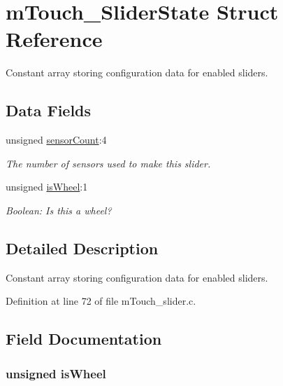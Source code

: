 \hypertarget{structm_touch___slider_state}{}\section{m\+Touch\+\_\+\+Slider\+State Struct Reference}
\label{structm_touch___slider_state}


Constant array storing configuration data for enabled sliders.  


\subsection*{Data Fields}
\begin{DoxyCompactItemize}
\item 
unsigned \hyperlink{structm_touch___slider_state_a87e15ba89028ea1a447211988f6b7d73}{sensor\+Count}\+:4
\begin{DoxyCompactList}\small\item\em The number of sensors used to make this slider. \end{DoxyCompactList}\item 
unsigned \hyperlink{structm_touch___slider_state_aa6a91983554a40f907525a98fd2b721c}{is\+Wheel}\+:1
\begin{DoxyCompactList}\small\item\em Boolean\+: Is this a wheel? \end{DoxyCompactList}\end{DoxyCompactItemize}


\subsection{Detailed Description}
Constant array storing configuration data for enabled sliders. 

Definition at line 72 of file m\+Touch\+\_\+slider.\+c.



\subsection{Field Documentation}
\hypertarget{structm_touch___slider_state_aa6a91983554a40f907525a98fd2b721c}{}
\subsubsection[{is\+Wheel}]{\setlength{\rightskip}{0pt plus 5cm}unsigned is\+Wheel}\label{structm_touch___slider_state_aa6a91983554a40f907525a98fd2b721c}


